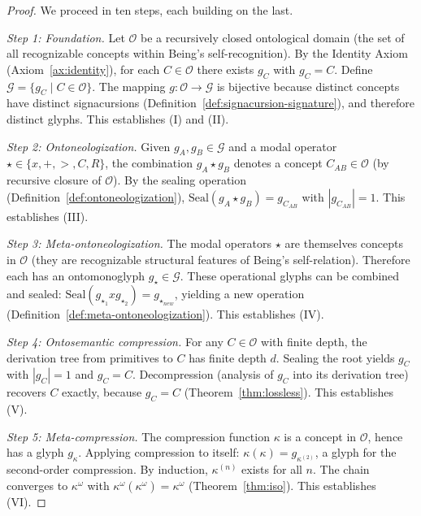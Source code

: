 \documentclass[12pt, letterpaper]{book}
\def\equiv{=}%
\def\otimes{x}%
\def\oplus{+}%
\def\triangleright{>}%
\def\subset{C}%
\def\circlearrowleft{R}%
\def\mathfrak#1{#1}%
\begin{document}
\begin{proof}
We proceed in ten steps, each building on the last.

\textit{Step 1: Foundation.} Let $\mathcal{O}$ be a recursively closed ontological domain (the set of all recognizable concepts within Being's self-recognition). By the Identity Axiom (Axiom~\ref{ax:identity}), for each $C \in \mathcal{O}$ there exists $\mathfrak{g}_C$ with $\mathfrak{g}_C \equiv C$. Define $\mathcal{G} \equiv \{\mathfrak{g}_C \mid C \in \mathcal{O}\}$. The mapping $\mathfrak{g}: \mathcal{O} \to \mathcal{G}$ is bijective because distinct concepts have distinct signacursions (Definition~\ref{def:signacursion-signature}), and therefore distinct glyphs. This establishes (I) and (II).

\textit{Step 2: Ontoneologization.} Given $\mathfrak{g}_A, \mathfrak{g}_B \in \mathcal{G}$ and a modal operator $\star \in \{\otimes, \oplus, \triangleright, \subset, \circlearrowleft\}$, the combination $\mathfrak{g}_A \star \mathfrak{g}_B$ denotes a concept $C_{AB} \in \mathcal{O}$ (by recursive closure of $\mathcal{O}$). By the sealing operation (Definition~\ref{def:ontoneologization}), $\mathrm{Seal}(\mathfrak{g}_A \star \mathfrak{g}_B) \equiv \mathfrak{g}_{C_{AB}}$ with $|\mathfrak{g}_{C_{AB}}| \equiv 1$. This establishes (III).

\textit{Step 3: Meta-ontoneologization.} The modal operators $\star$ are themselves concepts in $\mathcal{O}$ (they are recognizable structural features of Being's self-relation). Therefore each has an ontomonoglyph $\mathfrak{g}_\star \in \mathcal{G}$. These operational glyphs can be combined and sealed: $\mathrm{Seal}(\mathfrak{g}_{\star_1} \otimes \mathfrak{g}_{\star_2}) \equiv \mathfrak{g}_{\star_{new}}$, yielding a new operation (Definition~\ref{def:meta-ontoneologization}). This establishes (IV).

\textit{Step 4: Ontosemantic compression.} For any $C \in \mathcal{O}$ with finite depth, the derivation tree from primitives to $C$ has finite depth $d$. Sealing the root yields $\mathfrak{g}_C$ with $|\mathfrak{g}_C| \equiv 1$ and $\mathfrak{g}_C \equiv C$. Decompression (analysis of $\mathfrak{g}_C$ into its derivation tree) recovers $C$ exactly, because $\mathfrak{g}_C \equiv C$ (Theorem~\ref{thm:lossless}). This establishes (V).

\textit{Step 5: Meta-compression.} The compression function $\kappa$ is a concept in $\mathcal{O}$, hence has a glyph $\mathfrak{g}_\kappa$. Applying compression to itself: $\kappa(\kappa) \equiv \mathfrak{g}_{\kappa^{(2)}}$, a glyph for the second-order compression. By induction, $\kappa^{(n)}$ exists for all $n$. The chain converges to $\kappa^\omega$ with $\kappa^\omega(\kappa^\omega) \equiv \kappa^\omega$ (Theorem~\ref{thm:iso}). This establishes (VI).


\end{proof}
\end{document}
